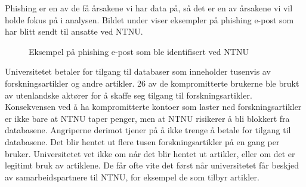 Phishing er en av de få årsakene vi har data på, så det er en av årsakene vi vil holde fokus på i analysen. Bildet under viser eksempler på phishing e-post som har blitt sendt til ansatte ved NTNU.

\begin{figure}[H]%
    \centering
    \qquad
    \qquad
    \caption[Eksempel på phishing e-post]{Eksempel på phishing e-post som ble identifisert ved NTNU}%
    \label{fig:example}%
\end{figure}

Universitetet betaler for tilgang til databaser som inneholder tusenvis av forskningsartikler og andre artikler. 26 av de kompromitterte brukerne ble brukt av utenlandske aktører for å skaffe seg tilgang til forskningsartikler. Konsekvensen ved å ha kompromitterte kontoer som laster ned forskningsartikler er ikke bare at NTNU taper penger, men at NTNU risikerer å bli blokkert fra databasene. Angriperne derimot tjener på å ikke trenge å betale for tilgang til databasene. Det blir hentet ut flere tusen forskningsartikler på en gang per bruker. Universitetet vet ikke om når det blir hentet ut artikler, eller om det er legitimt bruk av artiklene. De får ofte vite det først når universitetet får beskjed av samarbeidspartnere til NTNU, for eksempel de som tilbyr artikler. 

